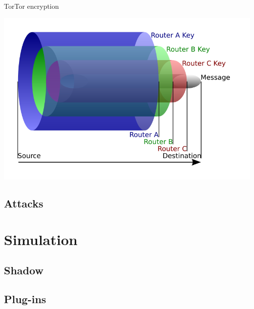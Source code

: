 \begin{frame}{Tor}{Tor encryption}
\begin{center}
\includegraphics[scale=0.35]{img/onion.png}
\end{center}
\end{frame}

\subsection{Attacks}
\begin{frame}
\end{frame}
\section{Simulation}
\subsection{Shadow}
\subsection{Plug-ins}
